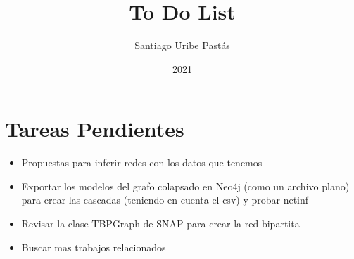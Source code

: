 \documentclass{article}
\title{To Do List}
\author{Santiago Uribe Pastás}
\date{2021}
\begin{document}
\maketitle

\section{Tareas Pendientes}
\begin{itemize}
    \item Propuestas para inferir redes con los datos que tenemos
    \item Exportar los modelos del grafo colapsado en Neo4j (como un archivo plano) para crear las cascadas (teniendo en cuenta el csv) y probar netinf
    \item Revisar la clase TBPGraph de SNAP para crear la red bipartita
    \item Buscar mas trabajos relacionados
\end{itemize}
\end{document}
